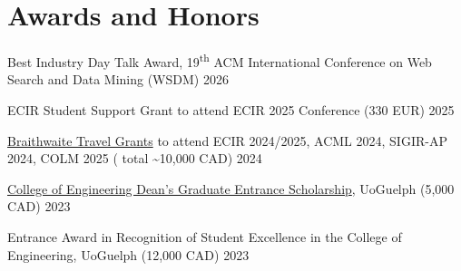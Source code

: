 \documentclass[]{resume-openfont}
\begin{document}
\section{Awards and Honors}
\vspace{-5pt}

\begin{bullets}[leftmargin=*]
    \item Best Industry Day Talk Award, 19\textsuperscript{th} ACM International Conference on Web Search and Data Mining (WSDM) \hfill 2026
    \item ECIR Student Support Grant to attend ECIR 2025 Conference (330 EUR) \hfill 2025
    \item \href{https://www.uoguelph.ca/regweb/studentfinance/apps/grawards?id=T6089}{Braithwaite Travel Grants} to attend ECIR 2024/2025, ACML 2024, SIGIR-AP 2024, COLM 2025 ( total \textasciitilde10,000 CAD) \hfill 2024
    \item \href{https://www.uoguelph.ca/registrar/studentfinance/apps/grawards?id=E6077}{College of Engineering Dean’s Graduate Entrance Scholarship}, UoGuelph (5,000 CAD) \hfill 2023
    \item Entrance Award in Recognition of Student Excellence in the College of Engineering, UoGuelph (12,000 CAD) \hfill 2023
\end{bullets}
\sectionsep
\end{document}
